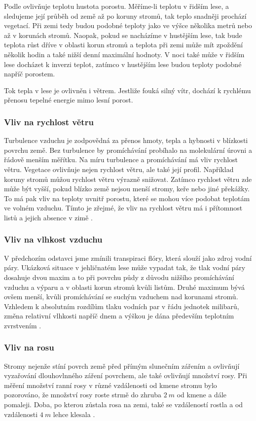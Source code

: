 Podle \cite{alma} ovlivňuje teplotu hustota porostu. Měříme-li teplotu v řidším lese, a sledujeme její průběh od země až po koruny stromů, tak teplo snadněji prochází vegetací. Při zemi tedy budou podobné teploty jako ve výšce několika metrů nebo až v korunách stromů. Naopak, pokud se nacházíme v hustějším lese, tak bude teplota růst dříve v oblasti korun stromů a teplota při zemi může mít zpoždění několik hodin a také nižší denní maximální hodnoty. V noci také může v řidším lese docházet k inverzi teplot, zatímco v hustějším lese budou teploty podobné napříč porostem. 

Tok tepla v lese je ovlivněn i větrem. Jestliže fouká silný vítr, dochází k rychlému přenosu tepelné energie mimo lesní porost\cite{alma}. 

\subsubsection{Vliv na rychlost větru}\label{chap:vlivnavitr}
Turbulence vzduchu je zodpovědná za přenos hmoty, tepla a hybnosti v blízkosti povrchu země. Bez turbulence by promíchávání probíhalo na molekulární úrovni a řádově menším měřítku. Na míru turbulence a promíchávání má vliv rychlost větru. Vegetace ovlivňuje nejen rychlost větru, ale také její profil. Například koruny stromů můžou rychlost větru výrazně snižovat. Zatímco rychlost větru zde může být vyšší, pokud blízko země nejsou menší stromy, keře nebo jiné překážky. To má pak vliv na teploty uvnitř porostu, které se mohou více podobat teplotám ve volném vzduchu. Tímto je zřejmé, že vliv na rychlost větru má i přítomnost listů a jejich absence v zimě \cite{alma}. 

\subsubsection{Vliv na vlhkost vzduchu}
V předchozím odstavci jsme zmínili transpiraci flóry, která slouží jako zdroj vodní páry. Ukázková situace v jehličnatém lese může vypadat tak, že tlak vodní páry dosahuje dvou maxim a to při povrchu půdy z důvodu nižšího promíchávání vzduchu a výparu a v oblasti korun stromů kvůli listům. Druhé maximum bývá ovšem menší, kvůli promíchávání se suchým vzduchem nad korunami stromů. Vzhledem k absolutním rozdílům tlaku vodních par v řádu jednotek milibarů, změna relativní vlhkosti napříč dnem a výškou je dána především teplotním zvrstvením \cite{alma}. 

\subsubsection{Vliv na rosu}
Stromy nejenže stíní povrch země před přímým slunečním zářením a ovlivňují vyzařování dlouhovlnného záření povrchem, ale také ovlivňují množství rosy. Při měření množství ranní rosy v různé vzdálenosti od kmene stromu bylo pozorováno, že množství rosy roste strmě do zhruba $\SI{2}{m}$ od kmene a dále pomaleji. Doba, po kterou zůstala rosa na zemi, také se vzdáleností rostla a od vzdálenosti $\SI{4}{m}$ lehce klesala \cite{alma}.

